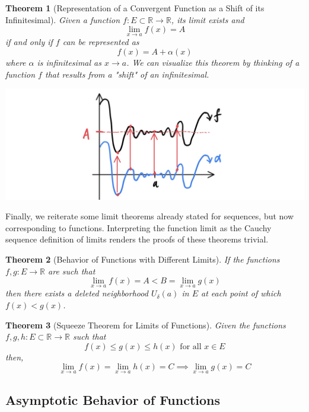 \documentclass{article}
\newtheorem{theorem}{Theorem}[section]
\theoremstyle{remark}
\theoremstyle{definition}
\begin{document}
\begin{theorem}[Representation of a Convergent Function as a Shift of its Infinitesimal]
Given a function $f: E \subset \mathbb{R} \longrightarrow \mathbb{R}$, its limit exists and 
\[\lim_{x \rightarrow a} f(x) = A\]
if and only if $f$ can be represented as 
\[f(x) = A + \alpha (x)\]
where $\alpha$ is infinitesimal as $x \rightarrow a$. We can visualize this theorem by thinking of a function $f$ that results from a "shift" of an infinitesimal. 
\begin{center}
    \includegraphics[scale=0.3]{img/Infinitesimal_Shift_Function.jpg}
\end{center}
\end{theorem}

Finally, we reiterate some limit theorems already stated for sequences, but now corresponding to functions. Interpreting the function limit as the Cauchy sequence definition of limits renders the proofs of these theorems trivial. 

\begin{theorem}[Behavior of Functions with Different Limits]
If the functions $f, g: E \rightarrow \mathbb{R}$ are such that
\[\lim_{x\rightarrow a} f(x) = A < B = \lim_{x \rightarrow a} g(x)\]
then there exists a deleted neighborhood $U_\delta (a)$ in $E$ at each point of which $f(x) < g(x)$. 
\end{theorem}

\begin{theorem}[Squeeze Theorem for Limits of Functions]
Given the functions $f, g, h: E \subset \mathbb{R} \longrightarrow \mathbb{R}$ such that
\[f(x) \leq g(x) \leq h(x) \text{ for all } x \in E\]
then, 
\[\lim_{x \rightarrow a} f(x) = \lim_{x \rightarrow a} h(x) = C \implies \lim_{x \rightarrow a} g(x) = C\]
\end{theorem}

\subsection{Asymptotic Behavior of Functions}
\end{document}

